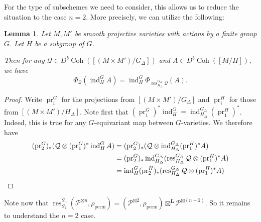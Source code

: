 \documentclass{amsart}
\theoremstyle{plain}
\newtheorem{lemma}[theorem]{Lemma}
\theoremstyle{definition}
\theoremstyle{remark}
\begin{document}
    For the type of subschemes we need to consider, this allows us to reduce the situation to the case $n=2$.
    More precisely, we can utilize the following:
    \begin{lemma}\label{induction_FM}
        Let $M,M'$ be smooth projective varieties with actions by a finite group $G$.
        Let $H$ be a subgroup of $G$.

        Then for any $\mathcal Q\in D^b\operatorname{Coh}([(M\times M')/G_\Delta])$ and $A\in D^b\operatorname{Coh}([M/H])$, we have
        \[\Phi_{\mathcal Q}(\operatorname{ind}_H^GA)= \operatorname{ind}_H^G\Phi_{\operatorname{res}^{G_\Delta}_{H_\Delta}\mathcal Q}(A).\]
    \end{lemma}
    \begin{proof}
        Write $\operatorname{pr}_i^G$ for the projections from $[(M\times M')/G_\Delta]$ and $\operatorname{pr}_i^H$ for those from $[(M\times M')/H_\Delta]$.
        Note first that $(\operatorname{pr}_1^G)^\ast\operatorname{ind}_H^G=\operatorname{ind}_{H_\Delta}^{G_\Delta}(\operatorname{pr}_1^H)^\ast$.
        Indeed, this is true for any $G$-equivariant map between $G$-varieties.
        We therefore have
        \begin{align*}
            (\operatorname{pr}_2^G)_\ast(\mathcal Q\otimes (\operatorname{pr}_1^G)^\ast \operatorname{ind}_H^GA)&=(\operatorname{pr}_2^G)_\ast(\mathcal Q\otimes\operatorname{ind}_{H_\Delta}^{G_\Delta}(\operatorname{pr}_1^H)^\ast A)\\
            &=(\operatorname{pr}_2^G)_\ast\operatorname{ind}_{H_\Delta}^{G_\Delta}(\operatorname{res}_{H_\Delta}^{G_\Delta}\mathcal Q\otimes (\operatorname{pr}_1^H)^\ast A)\\
            &=\operatorname{ind}_H^G(\operatorname{pr}_2^H)_\ast(\operatorname{res}_{H_\Delta}^{G_\Delta}\mathcal Q\otimes (\operatorname{pr}_1^H)^\ast A)\qedhere
        \end{align*}
    \end{proof}
    Note now that $\operatorname{res}_{S_2}^{S_n}(\mathcal P^{\boxtimes n},\rho_{\operatorname{perm}})=(\mathcal P^{\boxtimes 2},\rho_{\operatorname{perm}})\boxtimes^{\mathbf L}\mathcal P^{\boxtimes (n-2)}$.
    So it remains to understand the $n=2$ case.
\end{document}
